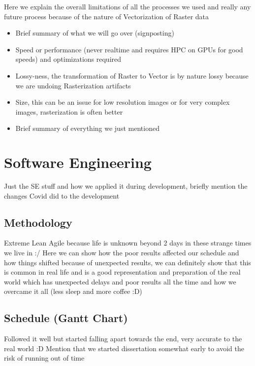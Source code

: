 \documentclass[14pt]{article}
\begin{document}
    Here we explain the overall limitations of all the processes we used and really any future process because
    of the nature of Vectorization of Raster data

    \begin{itemize}
        \item Brief summary of what we will go over (signposting)
        \item Speed or performance (never realtime and requires HPC on GPUs for good speeds) and optimizations required
        \item Lossy-ness, the transformation of Raster to Vector is by nature lossy because we are undoing Rasterization
        artifacts
        \item Size, this can be an issue for low resolution images or for very complex images, rasterization is often better
        \item Brief summary of everything we just mentioned
    \end{itemize}


    \section{Software Engineering}

    Just the SE stuff and how we applied it during development, briefly mention the changes Covid did to the development

    \subsection{Methodology}

    Extreme Lean Agile because life is unknown beyond 2 days in these strange times we live in :/
    \linebreak
    Here we can show how the poor results affected our schedule and how things shifted because of unexpected results,
    we can definitely show that this is common in real life and is a good representation and preparation of the real world
    which has unexpected delays and poor results all the time and how we overcame it all (less sleep and more coffee :D)

    \subsection{Schedule (Gantt Chart)}

    Followed it well but started falling apart towards the end, very accurate to the real world :D
    \linebreak
    Mention that we started dissertation somewhat early to avoid the risk of running out of time
\end{document}
